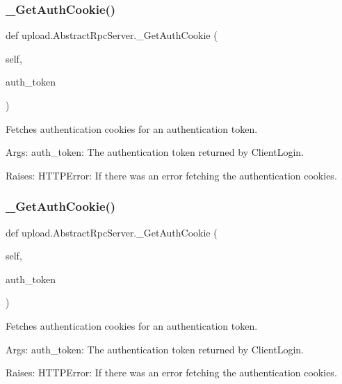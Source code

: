 \subsubsection{\texorpdfstring{\_GetAuthCookie()}{\_GetAuthCookie()}\hspace{0.1cm}{\footnotesize\ttfamily [1/2]}}
{\footnotesize\ttfamily def upload.\+Abstract\+Rpc\+Server.\+\_\+\+Get\+Auth\+Cookie (\begin{DoxyParamCaption}\item[{}]{self,  }\item[{}]{auth\+\_\+token }\end{DoxyParamCaption})\hspace{0.3cm}{\ttfamily [private]}}

\begin{DoxyVerb}Fetches authentication cookies for an authentication token.

Args:
  auth_token: The authentication token returned by ClientLogin.

Raises:
  HTTPError: If there was an error fetching the authentication cookies.
\end{DoxyVerb}
 \mbox{\label{classupload_1_1_abstract_rpc_server_a45ba7a36fd840608f532694be6b6a9ae}} 
\subsubsection{\texorpdfstring{\_GetAuthCookie()}{\_GetAuthCookie()}\hspace{0.1cm}{\footnotesize\ttfamily [2/2]}}
{\footnotesize\ttfamily def upload.\+Abstract\+Rpc\+Server.\+\_\+\+Get\+Auth\+Cookie (\begin{DoxyParamCaption}\item[{}]{self,  }\item[{}]{auth\+\_\+token }\end{DoxyParamCaption})\hspace{0.3cm}{\ttfamily [private]}}

\begin{DoxyVerb}Fetches authentication cookies for an authentication token.

Args:
  auth_token: The authentication token returned by ClientLogin.

Raises:
  HTTPError: If there was an error fetching the authentication cookies.
\end{DoxyVerb}
 \mbox{\label{classupload_1_1_abstract_rpc_server_a5a801cc3fdbb8222fa58d41e098f70a7}} 
